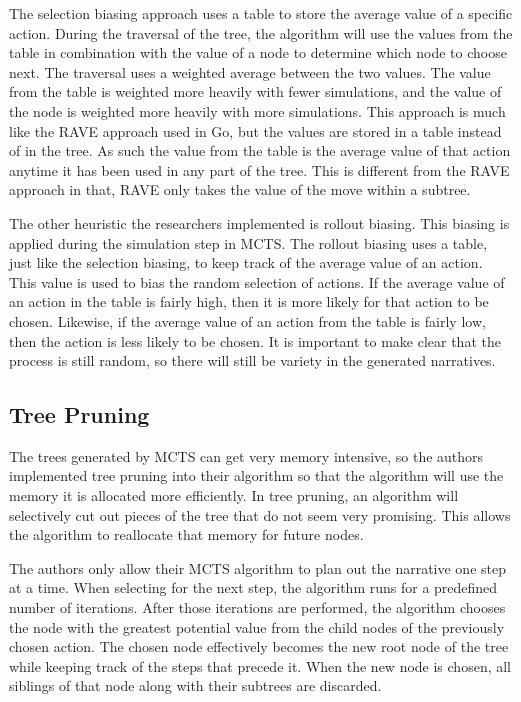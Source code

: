 \documentclass{sig-alternate}
\begin{document}
The selection biasing approach uses a table to store the average value of a specific action. During the traversal of the tree, the algorithm will use the values from the table in combination with the value of a node to determine which node to choose next. The traversal uses a weighted average between the two values. The value from the table is weighted more heavily with fewer simulations, and the value of the node is weighted more heavily with more simulations. This approach is much like the RAVE approach used in Go, but the values are stored in a table instead of in the tree. As such the value from the table is the average value of that action anytime it has been used in any part of the tree. This is different from the RAVE approach in that, RAVE only takes the value of the move within a subtree.

The other heuristic the researchers implemented is rollout biasing. This biasing is applied during the simulation step in MCTS. The rollout biasing uses a table, just like the selection biasing, to keep track of the average value of an action. This value is used to bias the random selection of actions. If the average value of an action in the table is fairly high, then it is more likely for that action to be chosen. Likewise, if the average value of an action from the table is fairly low, then the action is less likely to be chosen. It is important to make clear that the process is still random, so there will still be variety in the generated narratives.

\subsection{Tree Pruning}
The trees generated by MCTS can get very memory intensive, so the authors implemented tree pruning into their algorithm so that the algorithm will use the memory it is allocated more efficiently. In tree pruning, an algorithm will selectively cut out pieces of the tree that do not seem very promising. This allows the algorithm to reallocate that memory for future nodes. 

The authors only allow their MCTS algorithm to plan out the narrative one step at a time. When selecting for the next step, the algorithm runs for a predefined number of iterations. After those iterations are performed, the algorithm chooses the node with the greatest potential value from the child nodes of the previously chosen action. The chosen node effectively becomes the new root node of the tree while keeping track of the steps that precede it. When the new node is chosen, all siblings of that node along with their subtrees are discarded.
\end{document}
